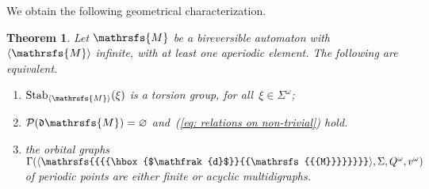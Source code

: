 \documentclass{amsart}
\newtheorem{theorem}{Theorem}[section]
\begin{document}
We obtain the following geometrical characterization.
\begin{theorem}\label{theo: characterization}
Let ${{{\mathrsfs{{M}}}}}$ be a bireversible automaton with
${{{\langle}{{\mathrsfs{{{M}}}}}{\rangle}}}$ infinite, with at least one aperiodic element. The following are equivalent.

\begin{enumerate}[label=(\roman{enumi})]
\item \label{characterizationi} 
 $\operatorname{Stab}_{{{\langle}{{\mathrsfs{{{M}}}}}{\rangle}}}(\xi)$ is a torsion group, for all~$\xi\in {{{\Sigma}}}^{\omega}$;
 \item \label{characterizationii}
 $\mathcal{P}({\hbox{$\mathfrak{d}$}}{{{\mathrsfs{{M}}}}})=\varnothing$ and~(\ref{eq: relations on non-trivial}) hold.
 \item \label{characterizationiii}
 the orbital graphs $\Gamma({{{{\langle}{{\mathrsfs{{{{\hbox{$\mathfrak{d}$}}{{\mathrsfs{{{M}}}}}}}}}}{\rangle}}}},{{{\Sigma}}}, {{{Q}}}^{\omega},v^{\omega})$ of periodic points are either finite or acyclic multidigraphs.
\end{enumerate}

\end{theorem}
\end{document}
